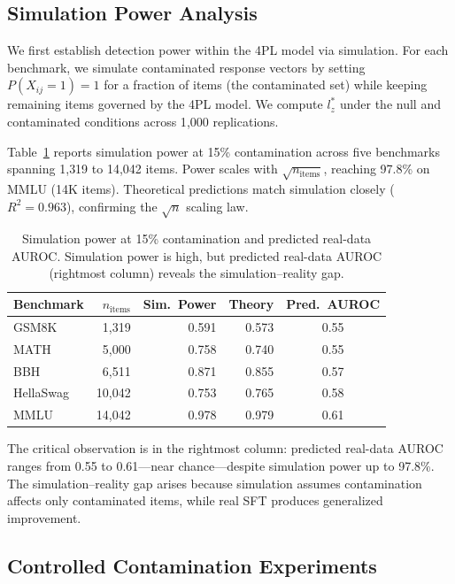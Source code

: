 \documentclass[11pt,a4paper]{article}
\begin{document}
\subsection{Simulation Power Analysis}
\label{sec:simulation}

We first establish detection power within the 4PL model via simulation.
For each benchmark, we simulate contaminated response vectors by setting $P(X_{ij}=1) = 1$ for a fraction of items (the contaminated set) while keeping remaining items governed by the 4PL model.
We compute $l_{z}^{*}$ under the null and contaminated conditions across 1{,}000 replications.

Table~\ref{tab:sim_power} reports simulation power at 15\% contamination across five benchmarks spanning 1{,}319 to 14{,}042 items.
Power scales with $\sqrt{n_{\text{items}}}$, reaching 97.8\% on MMLU (14K items).
Theoretical predictions match simulation closely ($R^2 = 0.963$), confirming the $\sqrt{n}$ scaling law.

\begin{table}[t]
\centering
\small
\begin{tabular}{lrrrc}
\toprule
Benchmark & $n_{\text{items}}$ & Sim.\ Power & Theory & Pred.\ AUROC \\
\midrule
GSM8K & 1{,}319 & 0.591 & 0.573 & 0.55 \\
MATH & 5{,}000 & 0.758 & 0.740 & 0.55 \\
BBH & 6{,}511 & 0.871 & 0.855 & 0.57 \\
HellaSwag & 10{,}042 & 0.753 & 0.765 & 0.58 \\
MMLU & 14{,}042 & 0.978 & 0.979 & 0.61 \\
\bottomrule
\end{tabular}
\caption{Simulation power at 15\% contamination and predicted real-data AUROC. Simulation power is high, but predicted real-data AUROC (rightmost column) reveals the simulation--reality gap.}
\label{tab:sim_power}
\end{table}

The critical observation is in the rightmost column: predicted real-data AUROC ranges from 0.55 to 0.61---near chance---despite simulation power up to 97.8\%.
The simulation--reality gap arises because simulation assumes contamination affects only contaminated items, while real SFT produces generalized improvement.

\subsection{Controlled Contamination Experiments}
\label{sec:controlled}
\end{document}
